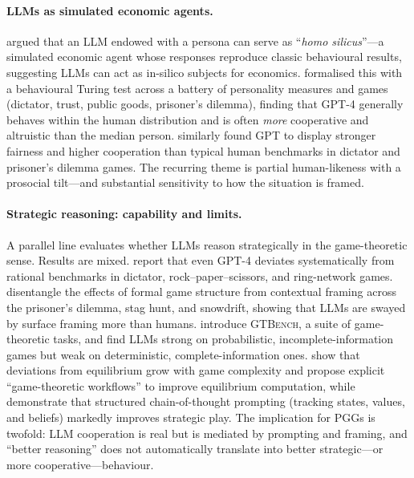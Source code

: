 \documentclass[11pt,a4paper]{article}
\begin{document}
\paragraph{LLMs as simulated economic agents.}
\citet{horton2023homosilicus} argued that an LLM endowed with a persona can serve
as ``\emph{homo silicus}''---a simulated economic agent whose responses reproduce
classic behavioural results, suggesting LLMs can act as in-silico subjects for
economics. \citet{mei2024turing} formalised this with a behavioural Turing test
across a battery of personality measures and games (dictator, trust, public goods,
prisoner's dilemma), finding that GPT-4 generally behaves within the human
distribution and is often \emph{more} cooperative and altruistic than the median
person. \citet{brookins2024playing} similarly found GPT to display stronger
fairness and higher cooperation than typical human benchmarks in dictator and
prisoner's dilemma games. The recurring theme is partial human-likeness with a
prosocial tilt---and substantial sensitivity to how the situation is framed.

\paragraph{Strategic reasoning: capability and limits.}
A parallel line evaluates whether LLMs reason strategically in the game-theoretic
sense. Results are mixed. \citet{fan2024rational} report that even GPT-4 deviates
systematically from rational benchmarks in dictator, rock--paper--scissors, and
ring-network games. \citet{lore2024strategic} disentangle the effects of formal
game structure from contextual framing across the prisoner's dilemma, stag hunt,
and snowdrift, showing that LLMs are swayed by surface framing more than humans.
\citet{duan2024gtbench} introduce \textsc{GTBench}, a suite of game-theoretic
tasks, and find LLMs strong on probabilistic, incomplete-information games but
weak on deterministic, complete-information ones. \citet{hua2024gametheoretic}
show that deviations from equilibrium grow with game complexity and propose
explicit ``game-theoretic workflows'' to improve equilibrium computation, while
\citet{gandhi2023strategic} demonstrate that structured chain-of-thought prompting
(tracking states, values, and beliefs) markedly improves strategic play. The
implication for PGGs is twofold: LLM cooperation is real but is mediated by
prompting and framing, and ``better reasoning'' does not automatically translate
into better strategic---or more cooperative---behaviour.
\end{document}
